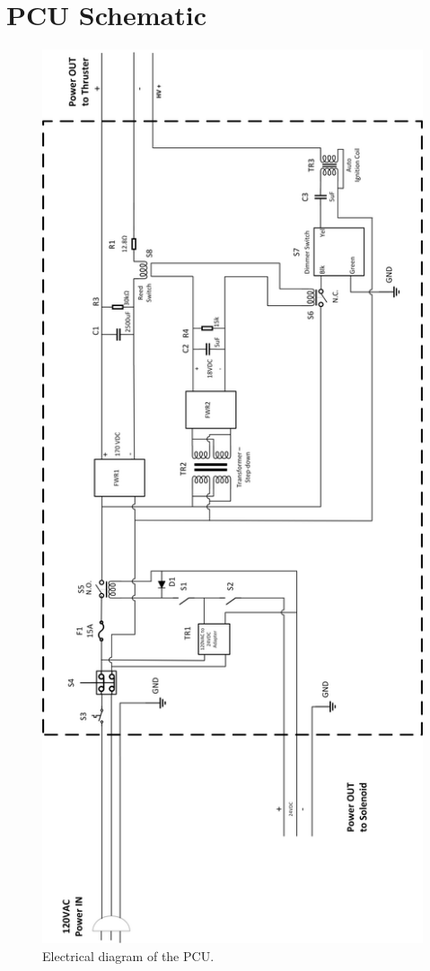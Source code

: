 \documentclass[journal]{IEEEtran}
\begin{document}




\onecolumn
\appendices{}
\section{PCU Schematic}
\begin{figure}[h]
  \includegraphics[height=.8\vsize,keepaspectratio]{figs/PCU_Schematic_No_AI_4_27_rotated.png}
  \caption{Electrical diagram of the PCU.}
\label{fig:pcu-schematic}
\end{figure}
\end{document}
